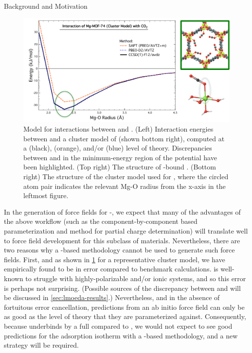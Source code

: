 \begin{section}{Background and Motivation}
    \begin{figure}
    \centering
    \includegraphics[width=1.0\textwidth]{lmoeda/sapt_breakdown.pdf}
    \caption{
Model \pes for interactions between \co and \mgmof.  (Left) Interaction
energies between \co and a cluster model of \mgmof (shown bottom right),
computed at a \ccsdtf (black), \sapt (orange), and/or \pbeod (blue) level of
theory. Discrepancies
between \sapt and \ccsdtf in the minimum-energy region of the potential have
been highlighted. (Top right)
The structure of \co-bound \mgmof. (Bottom right) The structure of the cluster
model used for \mgmof, where the circled atom pair indicates the relevant Mg-O
radius from the x-axis in the leftmost figure.
            }
    \label{fig:lmoeda-sapt_breakdown}
    \end{figure}


In the generation of force fields for \cus-\mofs, we expect that many of the
advantages of the above workflow (such as the component-by-component based
parameterization and method for partial charge determination) will translate
well to force field development for this subclass of \mof materials. 
Nevertheless, there are two reasons why a \sapt-based methodology
cannot be used to generate such force fields. First, and as shown in
\cref{fig:lmoeda-sapt_breakdown} for a representative \mgmof cluster model,
we have empirically found \sapt to be in error compared to benchmark
\ccsdtf calculations. \sapt is well-known to struggle with highly-polarizable
and/or ionic systems, and so this error is perhaps not surprising.
(Possible sources of the discrepancy between \sapt and \ccsdtf will be
discussed in \cref{sec:lmoeda-results}.) Nevertheless, and in the absence of
fortuitous error cancellation,
predictions from an ab initio force field can only be
as good as the
level of theory that they are parameterized against. Consequently, because
\sapt underbinds \co 
by a full  compared to \ccsdtf, we would not expect to see
good predictions for the \co adsorption isotherm with a \sapt-based
methodology, and a new strategy will be required.


\end{section}
